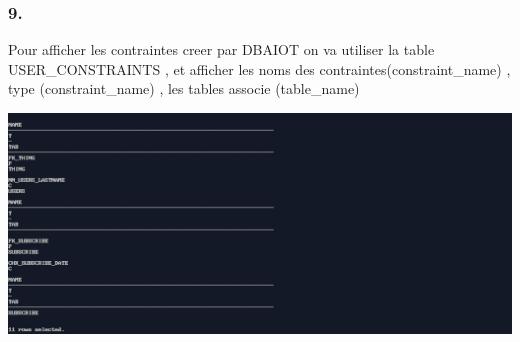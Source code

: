 \subsubsection*{9.}
Pour afficher les contraintes creer par DBAIOT on va utiliser la table USER\_CONSTRAINTS , et
afficher les noms des contraintes(constraint\_name) , type (constraint\_name) , les tables associe (table\_name)



\begin{center}
    \includegraphics[width=\textwidth]{ScreenShot/Partie5/const.png}
\end{center}


